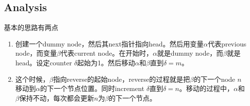 \subsection{Analysis}
基本的思路有两点
\begin{enumerate}
\item 创建一个dummy node，然后其next指针指向head。然后用变量$\alpha$代表previous node，而变量$\beta$代表current node。在开始时，$\alpha$就是dummy node，而$\beta$就是head。设定counter $\delta$起始为1。然后移动$\alpha$和$\beta$直到$\delta=m$。
\item 这个时候，$\beta$指向reverse的起始node，reverse的过程就是把$\beta$的下一个node $n$ 移动到$\alpha$的下一个节点位置。同时increment $\delta$直到$\delta=n$。移动的过程中，$\alpha$和$\beta$保持不动，每次都会更新$n$为$\beta$的下一个节点。
\end{enumerate}
